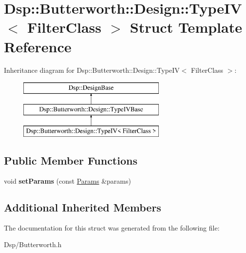 \hypertarget{structDsp_1_1Butterworth_1_1Design_1_1TypeIV}{\section{Dsp\-:\-:Butterworth\-:\-:Design\-:\-:Type\-I\-V$<$ Filter\-Class $>$ Struct Template Reference}
\label{structDsp_1_1Butterworth_1_1Design_1_1TypeIV}
}
Inheritance diagram for Dsp\-:\-:Butterworth\-:\-:Design\-:\-:Type\-I\-V$<$ Filter\-Class $>$\-:\begin{figure}[H]
\begin{center}
\leavevmode
\includegraphics[height=3.000000cm]{structDsp_1_1Butterworth_1_1Design_1_1TypeIV}
\end{center}
\end{figure}
\subsection*{Public Member Functions}
\begin{DoxyCompactItemize}
\item 
\hypertarget{structDsp_1_1Butterworth_1_1Design_1_1TypeIV_afb1d4ece5e4c2e06b6df79bf7f0679ca}{void {\bfseries set\-Params} (const \hyperlink{structDsp_1_1Params}{Params} \&params)}\label{structDsp_1_1Butterworth_1_1Design_1_1TypeIV_afb1d4ece5e4c2e06b6df79bf7f0679ca}

\end{DoxyCompactItemize}
\subsection*{Additional Inherited Members}


The documentation for this struct was generated from the following file\-:\begin{DoxyCompactItemize}
\item 
Dsp/Butterworth.\-h\end{DoxyCompactItemize}
